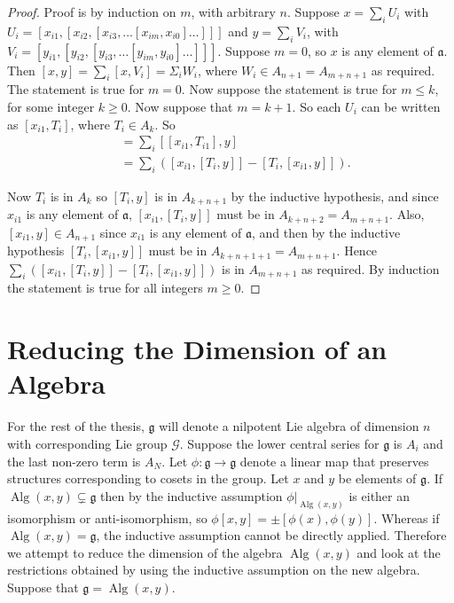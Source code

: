 \documentclass[honours]{UNSWthesis}
\newcommand{\G}{\mathcal{G}}
\newcommand{\g}{\mathfrak{g}}
\newcommand{\1}{\mathbf{e}_{1}}
\newcommand{\2}{\mathbf{e}_{3}}
\newcommand{\3}{\mathbf{e}_{3}}
\DeclareMathOperator{\alg}{Alg}
\begin{document}
\begin{proof}
Proof is by induction on $m$, with arbitrary $n$. Suppose $x=\sum\limits_{i} U_{i}$ with $U_{i}=[x_{i1},[x_{i2},[x_{i3},\ldots [x_{im},x_{i0}]\ldots]]]$ and $y=\sum\limits_{i} V_{i}$, with $V_{i}=[y_{i1},[y_{i2},[y_{i3},\ldots [y_{im},y_{i0}]\ldots]]]$.
\newline
Suppose $m=0$, so $x$ is any element of $\mathfrak{a}$. Then $[x,y]=\sum\limits_{i}[x,V_{i}]=\Sigma_{i}W_{i}$, where $W_{i} \in A_{n+1}=A_{m+n+1}$ as required. The statement is true for $m=0$. \newline
Now suppose the statement is true for $m \leq k$, for some integer $k \geq 0$. Now suppose that $m=k+1$. So each $U_{i}$ can be written as $[x_{i1},T_{i}]$, where $T_{i} \in A_{k}$. So
\begin{align*}
[x,y] &=\sum\limits_{i}[[x_{i1},T_{i1}],y] \\
&= \sum\limits_{i}([x_{i1},[T_{i},y]]-[T_{i},[x_{i1},y]]).
\end{align*}

Now $T_{i}$ is in $A_{k}$ so $[T_{i},y]$ is in $A_{k+n+1}$ by the inductive hypothesis, and since $x_{i1}$ is any element of $\mathfrak{a}$, $[x_{i1},[T_{i},y]]$ must be in $A_{k+n+2}=A_{m+n+1}$. \newline
Also, $[x_{i1},y] \in A_{n+1}$ since $x_{i1}$ is any element of $\mathfrak{a}$, and then by the inductive hypothesis $[T_{i},[x_{i1},y]]$ must be in $A_{k+n+1+1}=A_{m+n+1}$. \newline
Hence $\sum\limits_{i}([x_{i1},[T_{i},y]]-[T_{i},[x_{i1},y]])$ is in $A_{m+n+1}$ as required. By induction the statement is true for all integers $m \geq 0$.
\end{proof}




\section{Reducing the Dimension of an Algebra}
For the rest of the thesis, $\g$ will denote a nilpotent Lie algebra of dimension $n$ with corresponding Lie group $\G$. Suppose the lower central series for $\g$ is $A_{i}$ and the last non-zero term is $A_{N}$. Let $\phi: \g \longrightarrow \g$ denote a linear map that preserves structures corresponding to cosets in the group. \newline
Let $x$ and $y$ be elements of $\g$. If $\alg(x,y)\subsetneq \g$ then by the inductive assumption $\phi|_{\alg(x,y)}$ is either an isomorphism or anti-isomorphism, so $\phi[x,y]= \pm [\phi(x),\phi(y)]$. \newline
Whereas if $\alg(x,y)=\g$, the inductive assumption cannot be directly applied. Therefore we attempt to reduce the dimension of the algebra $\alg(x,y)$ and look at the restrictions obtained by using the inductive assumption on the new algebra. 
\newline Suppose that $\g=\alg(x,y)$.
\end{document}
